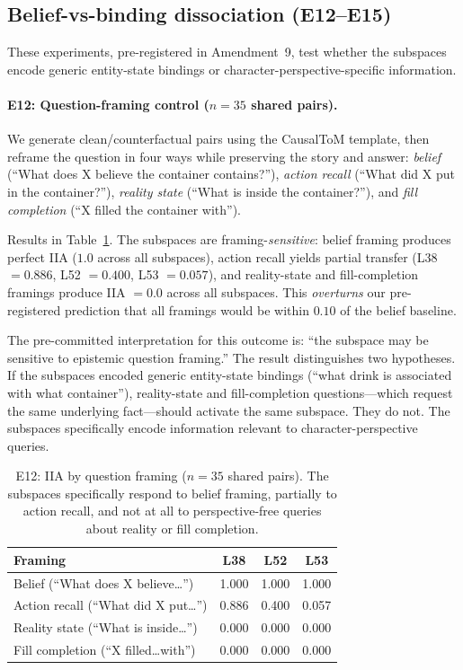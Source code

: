 \documentclass[11pt]{article}
\begin{document}
\subsection{Belief-vs-binding dissociation (E12--E15)}
\label{sec:dissociation_results}

These experiments, pre-registered in Amendment~9, test whether the subspaces encode generic entity-state bindings or character-perspective-specific information.

\paragraph{E12: Question-framing control ($n = 35$ shared pairs).}
We generate clean/counterfactual pairs using the CausalToM template, then reframe the question in four ways while preserving the story and answer: \emph{belief} (``What does X believe the container contains?''), \emph{action recall} (``What did X put in the container?''), \emph{reality state} (``What is inside the container?''), and \emph{fill completion} (``X filled the container with'').

Results in Table~\ref{tab:framing}. The subspaces are framing-\emph{sensitive}: belief framing produces perfect IIA ($1.0$ across all subspaces), action recall yields partial transfer (L38 $= 0.886$, L52 $= 0.400$, L53 $= 0.057$), and reality-state and fill-completion framings produce IIA $= 0.0$ across all subspaces. This \emph{overturns} our pre-registered prediction that all framings would be within $0.10$ of the belief baseline.

The pre-committed interpretation for this outcome is: ``the subspace may be sensitive to epistemic question framing.'' The result distinguishes two hypotheses. If the subspaces encoded generic entity-state bindings (``what drink is associated with what container''), reality-state and fill-completion questions---which request the same underlying fact---should activate the same subspace. They do not. The subspaces specifically encode information relevant to character-perspective queries.

\begin{table}[t]
\centering
\caption{E12: IIA by question framing ($n = 35$ shared pairs). The subspaces specifically respond to belief framing, partially to action recall, and not at all to perspective-free queries about reality or fill completion.}
\label{tab:framing}
\begin{tabular}{lccc}
\toprule
\textbf{Framing} & \textbf{L38} & \textbf{L52} & \textbf{L53} \\
\midrule
Belief (``What does X believe\ldots'') & 1.000 & 1.000 & 1.000 \\
Action recall (``What did X put\ldots'') & 0.886 & 0.400 & 0.057 \\
Reality state (``What is inside\ldots'') & 0.000 & 0.000 & 0.000 \\
Fill completion (``X filled\ldots with'') & 0.000 & 0.000 & 0.000 \\
\bottomrule
\end{tabular}
\end{table}
\end{document}
